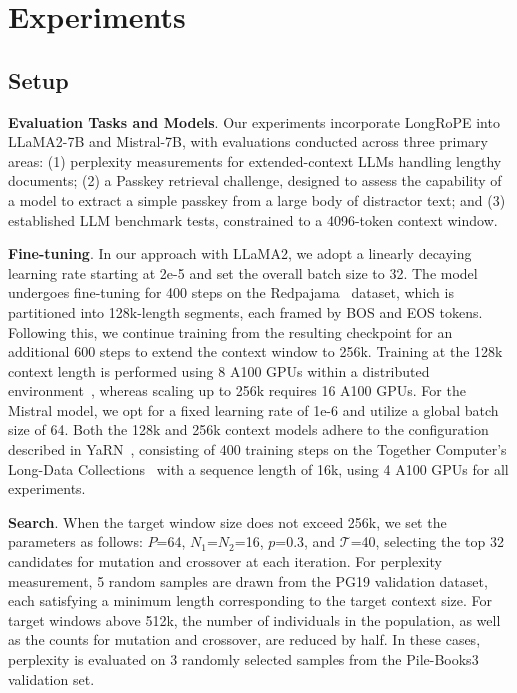  \section{Experiments}

\label{sec:exp}
\subsection{Setup}
\textbf{Evaluation Tasks and Models}. Our experiments incorporate LongRoPE into LLaMA2-7B and Mistral-7B, with evaluations conducted across three primary areas: (1) perplexity measurements for extended-context LLMs handling lengthy documents; (2) a Passkey retrieval challenge, designed to assess the capability of a model to extract a simple passkey from a large body of distractor text; and (3) established LLM benchmark tests, constrained to a 4096-token context window.

\textbf{Fine-tuning}. In our approach with LLaMA2, we adopt a linearly decaying learning rate starting at 2e-5 and set the overall batch size to 32. The model undergoes fine-tuning for 400 steps on the Redpajama~\cite{redpajama} dataset, which is partitioned into 128k-length segments, each framed by BOS and EOS tokens. Following this, we continue training from the resulting checkpoint for an additional 600 steps to extend the context window to 256k. Training at the 128k context length is performed using 8 A100 GPUs within a distributed environment~\cite{cube}, whereas scaling up to 256k requires 16 A100 GPUs. For the Mistral model, we opt for a fixed learning rate of 1e-6 and utilize a global batch size of 64. Both the 128k and 256k context models adhere to the configuration described in YaRN~\cite{yarn}, consisting of 400 training steps on the Together Computer's Long-Data Collections~\cite{mistraldata} with a sequence length of 16k, using 4 A100 GPUs for all experiments.

\textbf{Search}. When the target window size does not exceed 256k, we set the parameters as follows: $P$=64, $N_1$=$N_2$=16, $p$=0.3, and $\mathcal{T}$=40, selecting the top 32 candidates for mutation and crossover at each iteration. For perplexity measurement, 5 random samples are drawn from the PG19 validation dataset, each satisfying a minimum length corresponding to the target context size. For target windows above 512k, the number of individuals in the population, as well as the counts for mutation and crossover, are reduced by half. In these cases, perplexity is evaluated on 3 randomly selected samples from the Pile-Books3~\cite{pile} validation set.

